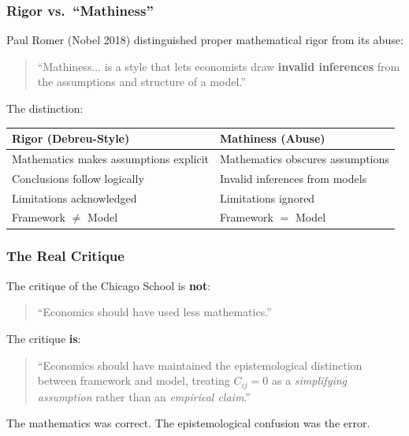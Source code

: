 \subsubsection{Rigor vs.\ ``Mathiness''}

Paul Romer (Nobel 2018) distinguished proper mathematical rigor from its abuse:
\begin{quote}
``Mathiness... is a style that lets economists draw \textbf{invalid inferences} from
the assumptions and structure of a model.'' \citep{romer2015}
\end{quote}

The distinction:
\begin{center}
\renewcommand{\arraystretch}{1.3}
\begin{tabular}{@{}p{5.5cm}p{5.5cm}@{}}
\toprule
\textbf{Rigor (Debreu-Style)} & \textbf{Mathiness (Abuse)} \\
\midrule
Mathematics makes assumptions explicit & Mathematics obscures assumptions \\
Conclusions follow logically & Invalid inferences from models \\
Limitations acknowledged & Limitations ignored \\
Framework $\neq$ Model & Framework $=$ Model \\
\bottomrule
\end{tabular}
\end{center}

\subsubsection{The Real Critique}

The critique of the Chicago School is \textbf{not}:
\begin{quote}
``Economics should have used less mathematics.''
\end{quote}

The critique \textbf{is}:
\begin{quote}
``Economics should have maintained the epistemological distinction between
framework and model, treating $C_{ij} = 0$ as a \textit{simplifying assumption}
rather than an \textit{empirical claim}.''
\end{quote}

The mathematics was correct. The epistemological confusion was the error.



